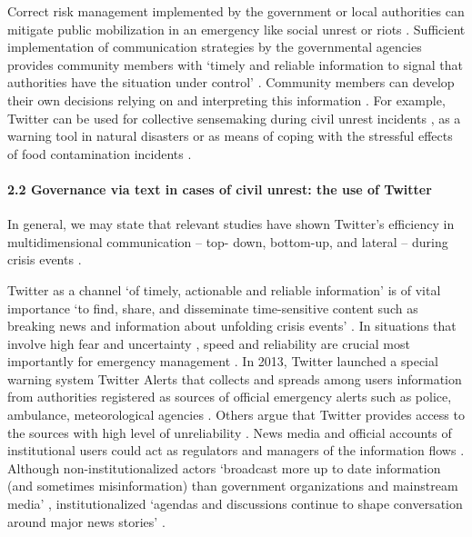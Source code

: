 Correct risk management implemented by the government or local authorities can mitigate public mobilization in an emergency like social unrest or riots \cite{KoltsovaKoltcov,Mileti,SalimovskyErmakova}. Sufficient implementation of communication strategies by the governmental agencies provides community members with ‘timely and reliable information to signal that authorities have the situation under control’ \cite[p.~86]{PalenViewegAnderson}. Community members can develop their own decisions relying on and interpreting this information \cite{ChangKannan,JungPark}. For example, Twitter can be used for collective sensemaking during civil unrest incidents \cite{ReadingTheRiots}, as a warning tool in natural disasters or as means of coping with the stressful effects \cite{DorasamyRamanKaliannan} of food contamination incidents \cite[p.~86]{PalenViewegAnderson}.

\paragraph{2.2 Governance via text in cases of civil unrest: the use of Twitter} 
In general, we may state that relevant studies have shown Twitter’s efficiency in multidimensional communication -- top- down, bottom-up, and lateral -- during crisis events \cite{AlSaggafSimmons,DorasamyRamanKaliannan,HorsleyBarker,HughesPalenSutton}.

Twitter as a channel ‘of timely, actionable and reliable information’ \cite[p.~86]{PalenViewegAnderson} is of vital importance ‘to find, share, and disseminate time-sensitive content such as breaking news and information about unfolding crisis events’ \cite[p.~1]{AlSaggafSimmons}\cite{BrionesKuchLiu,HughesPalenSutton,MengZhangZhao}. In situations that involve high fear and uncertainty \cite{AndrewsFichetDing,HondulaKrishnamurthy,PalenViewegAnderson}, speed and reliability are crucial most importantly for emergency management \cite{BirdLingHaynes,BodrunovaLitvinenkoGavraYakunin,DorasamyRamanKaliannan,ReadingTheRiots,HughesPalenSutton,Noveck,PalenViewegAnderson}. In 2013, Twitter launched a special warning system Twitter Alerts that collects and spreads among users information from authorities registered as sources of official emergency alerts such as police, ambulance, meteorological agencies \cite{PalenViewegAnderson}. Others argue that Twitter provides access to the sources with high level of unreliability \cite{AlSaggafSimmons}. News media and official accounts of institutional users could act as regulators and managers of the information flows \cite{AlSaggafSimmons,JinBrookeLucinda}. Although non-institutionalized actors ‘broadcast more up to date information (and sometimes misinformation) than government organizations and mainstream media’ \cite[p.~483]{KavanaughFoxSheetz}, institutionalized ‘agendas and discussions continue to shape conversation around major news stories’ \cite[p.~6]{MorrisCountsRoseway}.

